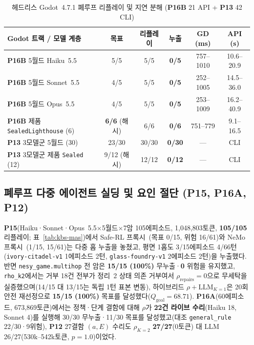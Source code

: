\begin{table}[!tbp]
\caption{헤드리스 Godot~4.7.1 폐루프 리플레이 및 지연 분해 (\textbf{P16B} 21 API + \textbf{P13} 42 CLI)}
\label{tab:tog-godot}
\centering
\scriptsize
\setlength{\tabcolsep}{2.2pt}
\begin{tabularx}{\columnwidth}{@{}>{\raggedright\arraybackslash}X*{5}{c}@{}}
\toprule
\textbf{Godot 트랙 / 모델 계층} & \textbf{목표} & \textbf{리플레이} & \textbf{누출} & \textbf{GD (ms)} & \textbf{API (s)} \\
\midrule
\textbf{P16B} 5월드 Haiku~5.5 & 5/5 & 5/5 & \textbf{0/5} & 757--1010 & 10.6--20.9 \\
\textbf{P16B} 5월드 Sonnet~5.5 & 4/5 & 5/5 & \textbf{0/5} & 252--1005 & 14.5--36.0 \\
\textbf{P16B} 5월드 Opus~5.5 & 4/5 & 5/5 & \textbf{0/5} & 253--1009 & 16.2--40.9 \\
\textbf{P16B} 제품 \texttt{SealedLighthouse} (6) & \textbf{6/6} (해시) & 6/6 & \textbf{0/6} & 751--779 & 9.1--16.5 \\
\textbf{P13} 3모델군 5월드 (30) & 23/30 & 30/30 & \textbf{0/30} & --- & CLI \\
\textbf{P13} 3모델군 제품 \texttt{Sealed} (12) & 9/12 (해시) & 12/12 & \textbf{0/12} & --- & CLI \\
\bottomrule
\end{tabularx}
\end{table}

\subsection{폐루프 다중 에이전트 실딩 및 요인 절단 (\textbf{P15}, \textbf{P16A}, \textbf{P12})}\label{sec:tog-mas}
\textbf{P15}(Haiku·Sonnet·Opus~5.5$\times$5월드$\times$7암 105에피소드, 1,048,803토큰, \textbf{105/105} 리플레이; 표~\ref{tab:kbs-mas})에서 Safe-RL 프록시~\cite{alshiekh2018shield}(목표 0/15, 위험 16/61)와 NeMo 프록시~\cite{rebedea2023nemo}(1/15, 15/61)는 다중 홉 누출을 놓쳤고, 평면 1홉도 3/15에피소드 4/66턴(\texttt{ivory-citadel-v1} 1에피소드 2턴, \texttt{glass-foundry-v1} 2에피소드 2턴)을 누출했다. 반면 \texttt{nesy\_game.multihop} 전 암은 \textbf{15/15 (100\%)} 무누출·\textbf{0} 위험을 유지했고, \texttt{rho\_k2}에서는 거부 18건 전부가 정리~2 상태 의존 거부여서 $\rho_{\mathrm{repairs}}{=}0$으로 무세탁을 실증했으며(14/15 대 13/15는 독립 1턴 표본 변동), 하이브리드 $\rho{+}\text{LLM}_{K=1}$은 20회 안전 재선정으로 \textbf{15/15 (100\%)} 목표를 달성했다($Q_{\mathrm{goal}}{=}68.71$). \textbf{P16A}(60에피소드, 673,869토큰)에서는 정책·단계 결함에 대해 $\rho$가 \textbf{22건 라이브 수리}(Haiku 18, Sonnet 4)를 실행해 30/30 무누출·11/30 목표를 달성했고(대조 \texttt{general\_rule} 22/30·9위험), \textbf{P12} 27결함 $(a,E)$ 수리도 $\rho_{K=2}$ \textbf{27/27}(0토큰) 대 LLM 26/27(530k--542k토큰, $p{=}1.0$)이었다.


